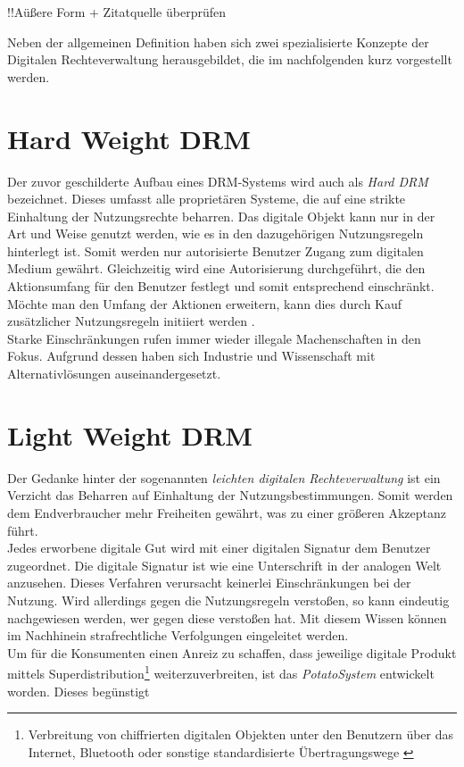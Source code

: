 \begin{spacing}{1.5}
!!Aüßere Form + Zitatquelle überprüfen

Neben der allgemeinen Definition haben sich zwei spezialisierte Konzepte der Digitalen Rechteverwaltung herausgebildet, die im nachfolgenden kurz vorgestellt werden.  


\section{Hard Weight DRM}
Der zuvor geschilderte Aufbau eines DRM-Systems wird auch als \textit{Hard DRM} bezeichnet. Dieses umfasst alle proprietären Systeme, die auf eine strikte Einhaltung der Nutzungsrechte beharren. Das digitale Objekt kann nur in der Art und Weise genutzt werden, wie es in den dazugehörigen Nutzungsregeln hinterlegt ist. Somit werden nur autorisierte Benutzer Zugang zum digitalen Medium gewährt. Gleichzeitig wird eine Autorisierung durchgeführt, die den Aktionsumfang für den Benutzer festlegt und somit entsprechend einschränkt. Möchte man den Umfang der Aktionen erweitern, kann dies durch Kauf zusätzlicher Nutzungsregeln initiiert werden \cite[S.335]{TypesOfDRM}. \\
Starke Einschränkungen rufen immer wieder illegale Machenschaften in den Fokus. Aufgrund dessen haben sich Industrie und Wissenschaft mit Alternativlösungen auseinandergesetzt.  
\label{sec: Hard Weight DRM}


\section{Light Weight DRM}
\label{sec:Light Weight DRM}
Der Gedanke hinter der sogenannten \textit{leichten digitalen Rechteverwaltung} ist ein Verzicht das Beharren auf Einhaltung der Nutzungsbestimmungen. Somit werden dem Endverbraucher mehr Freiheiten gewährt, was zu einer größeren Akzeptanz führt. \\
Jedes erworbene digitale Gut wird mit einer digitalen Signatur dem Benutzer zugeordnet. Die digitale Signatur ist wie eine Unterschrift in der analogen Welt anzusehen. Dieses Verfahren verursacht keinerlei Einschränkungen bei der Nutzung. Wird allerdings gegen die Nutzungsregeln verstoßen, so kann eindeutig nachgewiesen werden, wer gegen diese verstoßen hat. Mit diesem Wissen können im Nachhinein strafrechtliche Verfolgungen eingeleitet werden. \\
Um für die Konsumenten einen Anreiz zu schaffen, dass jeweilige digitale Produkt mittels Superdistribution\footnote{\label{foot:2}Verbreitung von chiffrierten digitalen Objekten unter den Benutzern über das Internet, Bluetooth oder sonstige standardisierte Übertragungswege \cite{Superdistribution}} weiterzuverbreiten, ist das \textit{PotatoSystem} entwickelt worden. Dieses begünstigt  



\end{spacing}

